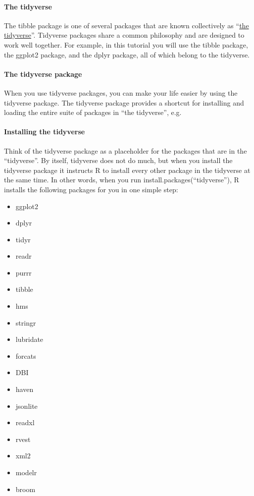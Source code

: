 \documentclass[
]{article}
\providecommand{\tightlist}{%
  \setlength{\itemsep}{0pt}\setlength{\parskip}{0pt}}
\begin{document}
\hypertarget{the-tidyverse}{%
\paragraph{The tidyverse}\label{the-tidyverse}}

The tibble package is one of several packages that are known
collectively as ``\href{http://tidyverse.org/}{the tidyverse}''.
Tidyverse packages share a common philosophy and are designed to work
well together. For example, in this tutorial you will use the tibble
package, the ggplot2 package, and the dplyr package, all of which belong
to the tidyverse.

\hypertarget{the-tidyverse-package}{%
\paragraph{The tidyverse package}\label{the-tidyverse-package}}

When you use tidyverse packages, you can make your life easier by using
the tidyverse package. The tidyverse package provides a shortcut for
installing and loading the entire suite of packages in ``the
tidyverse'', e.g.~

\hypertarget{installing-the-tidyverse}{%
\paragraph{Installing the tidyverse}\label{installing-the-tidyverse}}

Think of the tidyverse package as a placeholder for the packages that
are in the ``tidyverse''. By itself, tidyverse does not do much, but
when you install the tidyverse package it instructs R to install every
other package in the tidyverse at the same time. In other words, when
you run install.packages(``tidyverse''), R installs the following
packages for you in one simple step:

\begin{itemize}
\tightlist
\item
  ggplot2
\item
  dplyr
\item
  tidyr
\item
  readr
\item
  purrr
\item
  tibble
\item
  hms
\item
  stringr
\item
  lubridate
\item
  forcats
\item
  DBI
\item
  haven
\item
  jsonlite
\item
  readxl
\item
  rvest
\item
  xml2
\item
  modelr
\item
  broom
\end{itemize}
\end{document}
